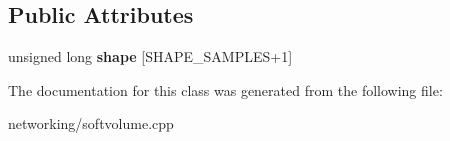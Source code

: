 \subsection*{Public Attributes}
\begin{DoxyCompactItemize}
\item 
unsigned long {\bfseries shape} \mbox{[}S\+H\+A\+P\+E\+\_\+\+S\+A\+M\+P\+L\+ES+1\mbox{]}\hypertarget{classshape__sampler_a9d51fb64223a569ea53c03c802b1a044}{}\label{classshape__sampler_a9d51fb64223a569ea53c03c802b1a044}

\end{DoxyCompactItemize}


The documentation for this class was generated from the following file\+:\begin{DoxyCompactItemize}
\item 
networking/softvolume.\+cpp\end{DoxyCompactItemize}
